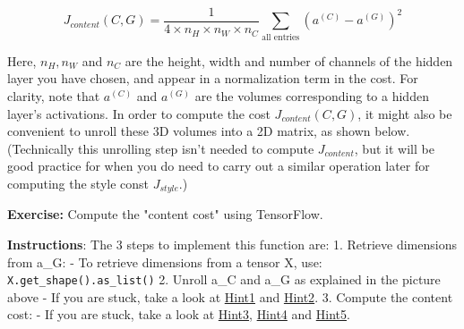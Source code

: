\documentclass[11pt]{article}
\begin{document}
\[J_{content}(C,G) =  \frac{1}{4 \times n_H \times n_W \times n_C}\sum _{ \text{all entries}} (a^{(C)} - a^{(G)})^2\tag{1} \]

Here, \(n_H, n_W\) and \(n_C\) are the height, width and number of
channels of the hidden layer you have chosen, and appear in a
normalization term in the cost. For clarity, note that \(a^{(C)}\) and
\(a^{(G)}\) are the volumes corresponding to a hidden layer's
activations. In order to compute the cost \(J_{content}(C,G)\), it might
also be convenient to unroll these 3D volumes into a 2D matrix, as shown
below. (Technically this unrolling step isn't needed to compute
\(J_{content}\), but it will be good practice for when you do need to
carry out a similar operation later for computing the style const
\(J_{style}\).)

\textbf{Exercise:} Compute the "content cost" using TensorFlow.

\textbf{Instructions}: The 3 steps to implement this function are: 1.
Retrieve dimensions from a\_G: - To retrieve dimensions from a tensor X,
use: \texttt{X.get\_shape().as\_list()} 2. Unroll a\_C and a\_G as
explained in the picture above - If you are stuck, take a look at
\href{https://www.tensorflow.org/versions/r1.3/api_docs/python/tf/transpose}{Hint1}
and
\href{https://www.tensorflow.org/versions/r1.2/api_docs/python/tf/reshape}{Hint2}.
3. Compute the content cost: - If you are stuck, take a look at
\href{https://www.tensorflow.org/api_docs/python/tf/reduce_sum}{Hint3},
\href{https://www.tensorflow.org/api_docs/python/tf/square}{Hint4} and
\href{https://www.tensorflow.org/api_docs/python/tf/subtract}{Hint5}.
\end{document}
